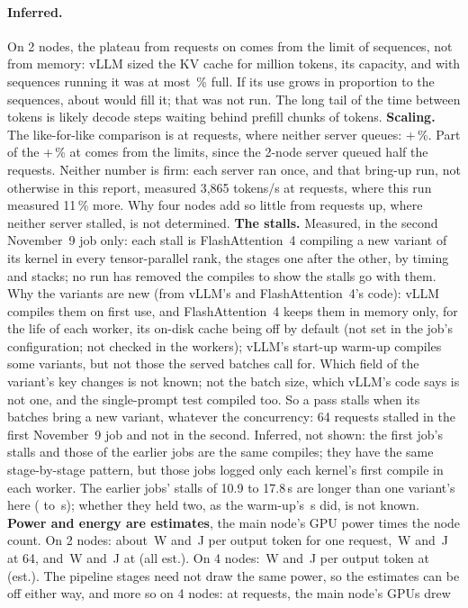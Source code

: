 \paragraph{Inferred.} On 2 nodes, the plateau from \TriKimiPeakConc{} requests on comes from the limit of \TriKimiMaxSeqs{} sequences, not from memory: vLLM sized the KV cache for \TriKimiKvTokens{} million tokens, its capacity, and with \TriKimiMaxSeqs{} sequences running it was at most \TriKimiKvUsePct\,\% full. If its use grows in proportion to the sequences, about \TriKimiKvFillSeqs{} would fill it; that was not run. The long tail of the time between tokens is likely decode steps waiting behind prefill chunks of \TriKimiChunk{} tokens. \textbf{Scaling.} The like-for-like comparison is at \TriKimiPeakConc{} requests, where neither server queues: +\TriKimiFourFiveTwelvePct\,\%. Part of the +\TriKimiFourTopPct\,\% at \TriKimiTopConc{} comes from the limits, since the 2-node server queued half the requests. Neither number is firm: each server ran once, and that bring-up run, not otherwise in this report, measured 3,865 tokens/s at \TriKimiTopConc{} requests, where this run measured 11\,\% more. Why four nodes add so little from \TriKimiPeakConc{} requests up, where neither server stalled, is not determined. \textbf{The stalls.} Measured, in the second November~9 job only: each stall is FlashAttention~4 compiling a new variant of its kernel in every tensor-parallel rank, the stages one after the other, by timing and stacks; no run has removed the compiles to show the stalls go with them. Why the variants are new (from vLLM's and FlashAttention~4's code): vLLM~\TriKimiVllm{} compiles them on first use, and FlashAttention~4 keeps them in memory only, for the life of each worker, its on-disk cache being off by default (not set in the job's configuration; not checked in the workers); vLLM's start-up warm-up compiles some variants, but not those the served batches call for. Which field of the variant's key changes is not known; not the batch size, which vLLM's code says is not one, and the single-prompt test compiled too. So a pass stalls when its batches bring a new variant, whatever the concurrency: 64 requests stalled in the first November~9 job and not in the second. Inferred, not shown: the first job's stalls and those of the earlier jobs are the same compiles; they have the same stage-by-stage pattern, but those jobs logged only each kernel's first compile in each worker. The earlier jobs' stalls of 10.9 to 17.8\,s are longer than one variant's here (\TriKcauseTwoFiftySixStall{} to \TriKcauseTwoFiftySixStallSecond\,s); whether they held two, as the warm-up's \TriKcauseWarmStall\,s did, is not known. \textbf{Power and energy are estimates}, the main node's GPU power times the node count. On 2 nodes: about \TriKimiPowerOne\,W and \TriKimiJOne\,J per output token for one request, \TriKimiPowerSixtyFour\,W and \TriKimiJSixtyFour\,J at 64, and \TriKimiPowerPeak\,W and \TriKimiJPeak\,J at \TriKimiPeakConc{} (all est.). On 4 nodes: \TriKimiFourPowerTop\,W and \TriKimiFourJTop\,J per output token at \TriKimiTopConc{} (est.). The pipeline stages need not draw the same power, so the estimates can be off either way, and more so on 4 nodes: at \TriKimiTopConc{} requests, the main node's GPUs drew 